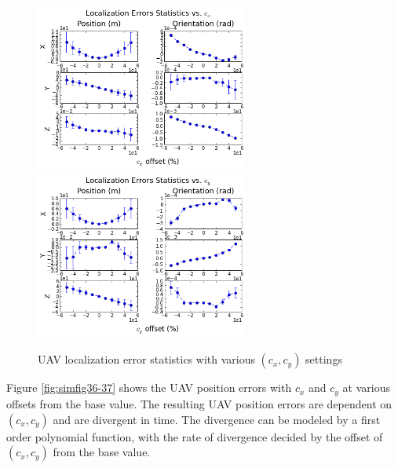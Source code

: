 \begin{figure}[h]
  \centering
  \includegraphics[width=7cm, keepaspectratio=true]{./Figures/SimulationFigures/Figure34.png}
  \includegraphics[width=7cm, keepaspectratio=true]{./Figures/SimulationFigures/Figure35.png}
  \caption{UAV localization error statistics with various $(c_x, c_y)$
  settings}
  \label{fig:simfig34-35}
\end{figure}

Figure \ref{fig:simfig36-37} shows the UAV position errors with $c_x$
and $c_y$ at various offsets from the base value. The resulting UAV
position errors are dependent on $(c_{x}, c_{y})$ and are
divergent in time. The divergence can be modeled by a first order
polynomial function, with the rate of divergence decided by the offset
of $(c_{x}, c_{y})$ from the base value.

